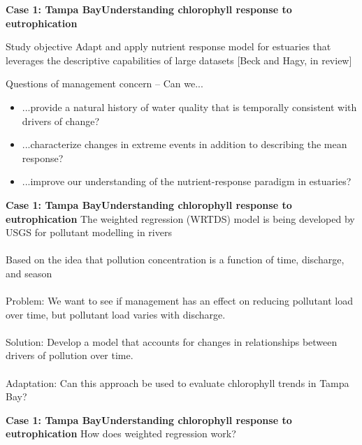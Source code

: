 \documentclass[serif]{beamer}\usepackage[]{graphicx}\usepackage[]{color}
\begin{document}
\begin{frame}{\textbf{Case 1: Tampa Bay}}{\textbf{Understanding chlorophyll response to eutrophication}}
\onslide<+->
\begin{block}{Study objective}
Adapt and apply nutrient response model for estuaries that leverages the descriptive capabilities of large datasets \scriptsize [Beck and Hagy, in review]
\end{block}
\vspace{0.2in}
\onslide<+->
Questions of management concern -- Can we...
\begin{itemize}
\item ...provide a natural history of water quality that is temporally consistent with drivers of change?
\onslide<+->
\item ...characterize changes in extreme events in addition to describing the mean response?  
\onslide<+->
\item ...improve our understanding of the nutrient-response paradigm in estuaries?
\end{itemize}
\end{frame}

\begin{frame}{\textbf{Case 1: Tampa Bay}}{\textbf{Understanding chlorophyll response to eutrophication}}
\onslide<+->
The \alert{weighted regression (WRTDS)} model is being developed by USGS for pollutant modelling in rivers \cite{Hirsch10}\\~\\
Based on the idea that pollution concentration is a function of \alert{time}, \alert{discharge}, and \alert{season}\\~\\
\onslide<+->
\alert{Problem:} We want to see if management has an effect on reducing pollutant load over time, but pollutant load varies with discharge.\\~\\
\onslide<+->
\alert{Solution:} Develop a model that accounts for changes in relationships between drivers of pollution over time.\\~\\
\onslide<+->
\alert{Adaptation:} Can this approach be used to evaluate chlorophyll trends in Tampa Bay?
\end{frame}



\begin{frame}{\textbf{Case 1: Tampa Bay}}{\textbf{Understanding chlorophyll response to eutrophication}}
How does weighted regression work?
\begin{center}
\end{center}
\end{frame}
\end{document}
